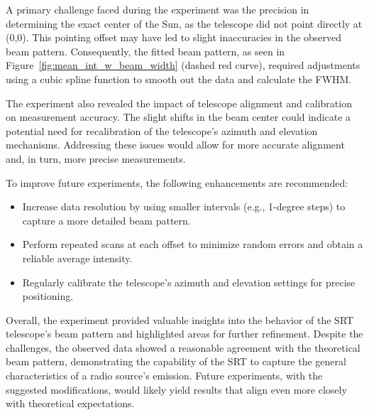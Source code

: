 \documentclass[linenumbers,twocolumn]{aastex631}
\begin{document}
A primary challenge faced during the experiment was the precision in determining the exact center of the Sun, as the telescope did not point directly at (0,0). This pointing offset may have led to slight inaccuracies in the observed beam pattern. Consequently, the fitted beam pattern, as seen in Figure~\ref{fig:mean_int_w_beam_width} (dashed red curve), required adjustments using a cubic spline function to smooth out the data and calculate the FWHM.

The experiment also revealed the impact of telescope alignment and calibration on measurement accuracy. The slight shifts in the beam center could indicate a potential need for recalibration of the telescope's azimuth and elevation mechanisms. Addressing these issues would allow for more accurate alignment and, in turn, more precise measurements.

To improve future experiments, the following enhancements are recommended:

\begin{itemize}
    \item Increase data resolution by using smaller intervals (e.g., 1-degree steps) to capture a more detailed beam pattern.
    \item Perform repeated scans at each offset to minimize random errors and obtain a reliable average intensity.
    \item Regularly calibrate the telescope's azimuth and elevation settings for precise positioning.
\end{itemize}

Overall, the experiment provided valuable insights into the behavior of the SRT telescope's beam pattern and highlighted areas for further refinement. Despite the challenges, the observed data showed a reasonable agreement with the theoretical beam pattern, demonstrating the capability of the SRT to capture the general characteristics of a radio source's emission. Future experiments, with the suggested modifications, would likely yield results that align even more closely with theoretical expectations.


\end{document}
